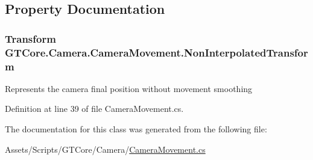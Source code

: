 \subsection{Property Documentation}
\hypertarget{class_g_t_core_1_1_camera_1_1_camera_movement_ae91326322724ddf4ef145703e4b16eba}{}
\subsubsection[{Non\+Interpolated\+Transform}]{\setlength{\rightskip}{0pt plus 5cm}Transform G\+T\+Core.\+Camera.\+Camera\+Movement.\+Non\+Interpolated\+Transform\hspace{0.3cm}{\ttfamily [get]}}\label{class_g_t_core_1_1_camera_1_1_camera_movement_ae91326322724ddf4ef145703e4b16eba}


Represents the camera final position without movement smoothing 



Definition at line 39 of file Camera\+Movement.\+cs.



The documentation for this class was generated from the following file\+:\begin{DoxyCompactItemize}
\item 
Assets/\+Scripts/\+G\+T\+Core/\+Camera/\hyperlink{_camera_movement_8cs}{Camera\+Movement.\+cs}\end{DoxyCompactItemize}
